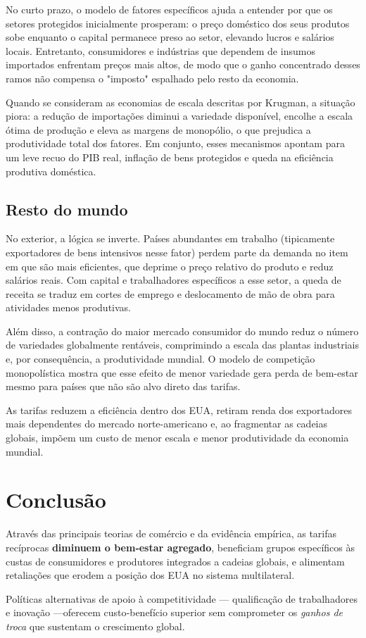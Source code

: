 \documentclass[a4paper,12pt]{article}[abntex2]
\begin{document}
No curto prazo, o modelo de fatores específicos ajuda a entender por que os setores protegidos inicialmente prosperam: o preço doméstico dos seus produtos sobe enquanto o capital permanece preso ao setor, elevando lucros e salários locais. Entretanto, consumidores e indústrias que dependem de insumos importados enfrentam preços mais altos, de modo que o ganho concentrado desses ramos não compensa o "imposto" espalhado pelo resto da economia. 

Quando se consideram as economias de escala descritas por Krugman, a situação piora: a redução de importações diminui a variedade disponível, encolhe a escala ótima de produção e eleva as margens de monopólio, o que prejudica a produtividade total dos fatores. Em conjunto, esses mecanismos apontam para um leve recuo do PIB real, inflação de bens protegidos e queda na eficiência produtiva doméstica.

\subsection*{\textbf{Resto do mundo}}

No exterior, a lógica se inverte. Países abundantes em trabalho (tipicamente exportadores de bens intensivos nesse fator) perdem parte da demanda no item em que são mais eficientes, que deprime o preço relativo do produto e reduz salários reais. Com capital e trabalhadores específicos a esse setor, a queda de receita se traduz em cortes de emprego e deslocamento de mão de obra para atividades menos produtivas. 

Além disso, a contração do maior mercado consumidor do mundo reduz o número de variedades globalmente rentáveis, comprimindo a escala das plantas industriais e, por consequência, a produtividade mundial. O modelo de competição monopolística mostra que esse efeito de menor variedade gera perda de bem-estar mesmo para países que não são alvo direto das tarifas.

As tarifas reduzem a eficiência dentro dos EUA, retiram renda dos exportadores mais dependentes do mercado norte-americano e, ao fragmentar as cadeias globais, impõem um custo de menor escala e menor produtividade da economia mundial.

\section*{\textbf{Conclusão}}

Através das principais teorias de comércio e da evidência empírica, as tarifas recíprocas \textbf{diminuem o bem‑estar agregado}, beneficiam grupos específicos às custas de consumidores e produtores integrados a cadeias globais, e alimentam retaliações que erodem a posição dos EUA no sistema multilateral. 

Políticas alternativas de apoio à competitividade — qualificação de trabalhadores e inovação —oferecem custo‑benefício superior sem comprometer os \textit{ganhos de troca} que sustentam o crescimento global.
\end{document}
